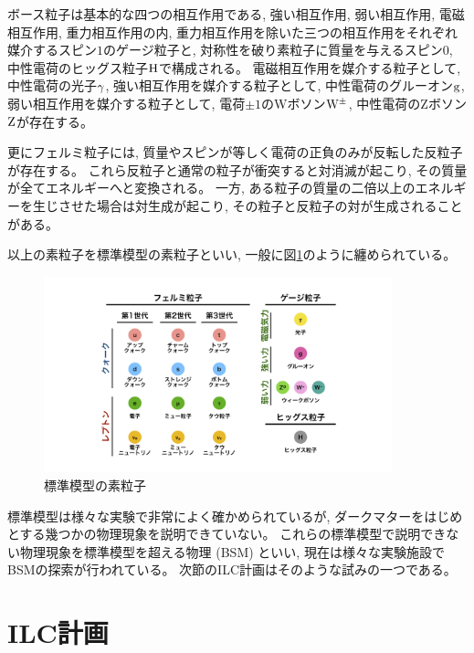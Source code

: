 ボース粒子は基本的な四つの相互作用である, 強い相互作用, 弱い相互作用, 電磁相互作用, 重力相互作用の内, 重力相互作用を除いた三つの相互作用をそれぞれ媒介するスピン$1$のゲージ粒子と, 対称性を破り素粒子に質量を与えるスピン$0$, 中性電荷のヒッグス粒子$\rm H$で構成される。
電磁相互作用を媒介する粒子として, 中性電荷の光子$\rm \gamma$, 強い相互作用を媒介する粒子として, 中性電荷のグルーオン$\rm g$, 弱い相互作用を媒介する粒子として, 電荷$\pm 1$のWボソン$\rm W^{\pm}$, 中性電荷のZボソン$\rm Z$が存在する。

更にフェルミ粒子には, 質量やスピンが等しく電荷の正負のみが反転した反粒子が存在する。
これら反粒子と通常の粒子が衝突すると対消滅が起こり, その質量が全てエネルギーへと変換される。
一方, ある粒子の質量の二倍以上のエネルギーを生じさせた場合は対生成が起こり, その粒子と反粒子の対が生成されることがある。

以上の素粒子を標準模型の素粒子といい, 一般に図\ref{1SMParticle}のように纏められている。

\begin{figure}[htbp]
 \centering
 \includegraphics[width=0.9\textwidth]{Figure/1Introduction/1SMParticle.png}
 \caption{標準模型の素粒子}
 \label{1SMParticle}
\end{figure}

標準模型は様々な実験で非常によく確かめられているが, ダークマターをはじめとする幾つかの物理現象を説明できていない。
これらの標準模型で説明できない物理現象を標準模型を超える物理 (BSM) といい, 現在は様々な実験施設でBSMの探索が行われている。
次節のILC計画はそのような試みの一つである。


\section{ILC計画} \label{Intro:InternationalLinearColliderProject}

